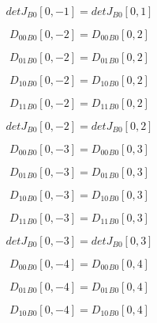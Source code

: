 \documentclass{article}
\begin{document}
\begin{dmath}{detJ{_{B0}}}[{0,-1}] = {detJ{_{B0}}}[{0,1}]\end{dmath}

\begin{dmath}{D_{00}{_{B0}}}[{0,-2}] = {D_{00}{_{B0}}}[{0,2}]\end{dmath}

\begin{dmath}{D_{01}{_{B0}}}[{0,-2}] = {D_{01}{_{B0}}}[{0,2}]\end{dmath}

\begin{dmath}{D_{10}{_{B0}}}[{0,-2}] = {D_{10}{_{B0}}}[{0,2}]\end{dmath}

\begin{dmath}{D_{11}{_{B0}}}[{0,-2}] = {D_{11}{_{B0}}}[{0,2}]\end{dmath}

\begin{dmath}{detJ{_{B0}}}[{0,-2}] = {detJ{_{B0}}}[{0,2}]\end{dmath}

\begin{dmath}{D_{00}{_{B0}}}[{0,-3}] = {D_{00}{_{B0}}}[{0,3}]\end{dmath}

\begin{dmath}{D_{01}{_{B0}}}[{0,-3}] = {D_{01}{_{B0}}}[{0,3}]\end{dmath}

\begin{dmath}{D_{10}{_{B0}}}[{0,-3}] = {D_{10}{_{B0}}}[{0,3}]\end{dmath}

\begin{dmath}{D_{11}{_{B0}}}[{0,-3}] = {D_{11}{_{B0}}}[{0,3}]\end{dmath}

\begin{dmath}{detJ{_{B0}}}[{0,-3}] = {detJ{_{B0}}}[{0,3}]\end{dmath}

\begin{dmath}{D_{00}{_{B0}}}[{0,-4}] = {D_{00}{_{B0}}}[{0,4}]\end{dmath}

\begin{dmath}{D_{01}{_{B0}}}[{0,-4}] = {D_{01}{_{B0}}}[{0,4}]\end{dmath}

\begin{dmath}{D_{10}{_{B0}}}[{0,-4}] = {D_{10}{_{B0}}}[{0,4}]\end{dmath}
\end{document}

